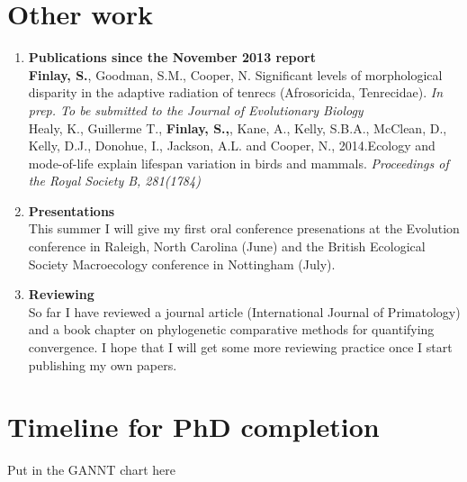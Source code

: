 \documentclass[12pt,a4paper]{article}
\begin{document}
\section{Other work}
\begin{enumerate}

\item \textbf{Publications since the November 2013 report}\\
\textbf{Finlay, S.}, Goodman, S.M., Cooper, N. Significant levels of morphological disparity in the adaptive radiation of tenrecs (Afrosoricida, Tenrecidae). \textit{In prep. To be submitted to the Journal of Evolutionary Biology}\\
\bigskip %
Healy, K., Guillerme T., \textbf{Finlay, S.,}, Kane, A., Kelly, S.B.A., McClean, D., Kelly, D.J., Donohue, I., Jackson, A.L. and Cooper, N., 2014.Ecology and mode-of-life explain lifespan variation in birds and mammals. \textit{Proceedings of the Royal Society B, 281(1784)} 

\item \textbf{Presentations}\\
This summer I will give my first oral conference presenations at the Evolution conference in Raleigh, North Carolina (June) and the British Ecological Society Macroecology conference in Nottingham (July).

\item \textbf{Reviewing}\\

So far I have reviewed a journal article (International Journal of Primatology) and a book chapter on phylogenetic comparative methods for quantifying convergence. I hope that I will get some more reviewing practice once I start publishing my own papers.

\end{enumerate}

\section{Timeline for PhD completion}
Put in the GANNT chart here


\end{document}
